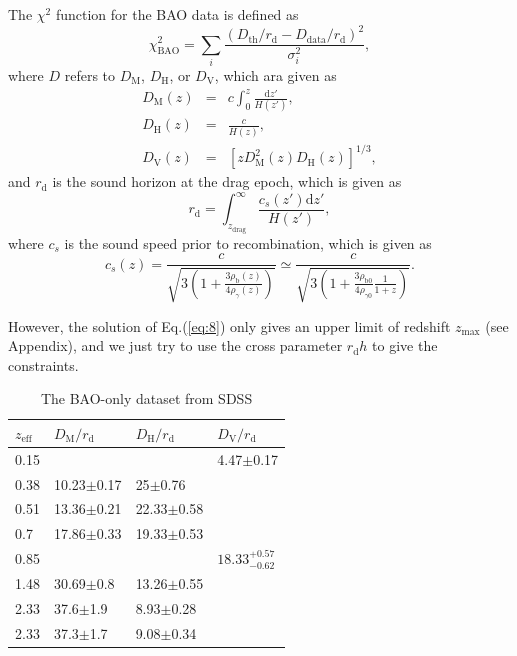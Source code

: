 \documentclass[twocolumn]{aastex631}
\begin{document}
   The $\chi^2$ function for the BAO data is defined as
   \begin{equation}
      \chi_{\text{BAO}}^2=\sum_i\frac{(D_{\text{th}}/r_{\text{d}}-D_{\text{data}}/r_{\text{d}})^2}{\sigma_i^2},
   \end{equation}
   where $D$ refers to $D_{\text{M}}$, $D_{\text{H}}$, or $D_{\text{V}}$, which ara given as
   \begin{eqnarray}
      D_{\text{M}}(z)&=&c\int_0^z\frac{\text{d}z'}{H(z')},\\
      D_{\text{H}}(z)&=&\frac{c}{H(z)},\\
      D_{\text{V}}(z)&=&\left[zD_{\text{M}}^2(z)D_{\text{H}}(z)\right]^{1/3},
   \end{eqnarray}
   and $r_{\text{d}}$ is the sound horizon at the drag epoch, which is given as
   \begin{equation}
      r_{\text{d}}=\int_{z_{\text{drag}}}^{\infty}\frac{c_s(z')\text{d}z'}{H(z')},
   \end{equation}
   where $c_s$ is the sound speed prior to recombination, which is given as
   \begin{equation}
      c_s(z)=\frac{c}{\sqrt{3\left(1+\frac{3\rho_{\mathrm{b}}(z)}{4\rho_{\gamma}(z)}\right)}}\simeq
      \frac{c}{\sqrt{3\left(1+\frac{3\rho_{\mathrm{b}0}}{4\rho_{\gamma0}}\frac{1}{1+z}\right)}}.
   \end{equation}

   However, the solution of Eq.(\ref{eq:8}) only gives an upper limit of redshift $z_{\max}$
   (see Appendix), and we just try to use the cross
   parameter $r_{\text{d}}h$ to give the constraints.

   \begin{table}[htbp]
      \caption{The BAO-only dataset from SDSS}
      \centering
      \begin{tabular}{llll}
         \hline\hline
         $z_{\text{eff}}$ & $D_{\text{M}}/r_{\text{d}}$ & $D_{\text{H}}/r_{\text{d}}$ & $D_{\text{V}}/r_{\text{d}}$ \\
         \hline
         0.15 & & & 4.47$\pm$0.17 \\
         0.38 & 10.23$\pm$0.17 & 25$\pm$0.76 & \\
         0.51 & 13.36$\pm$0.21 & 22.33$\pm$0.58 & \\
         0.7 & 17.86$\pm$0.33 & 19.33$\pm$0.53 & \\
         0.85 & & & $18.33_{-0.62}^{+0.57}$ \\
         1.48 & 30.69$\pm$0.8 & 13.26$\pm$0.55 & \\
         2.33 & 37.6$\pm$1.9 & 8.93$\pm$0.28 & \\
         2.33 & 37.3$\pm$1.7 & 9.08$\pm$0.34 & \\
         \hline
      \end{tabular}
      \label{tab:2}
   \end{table}
\end{document}
